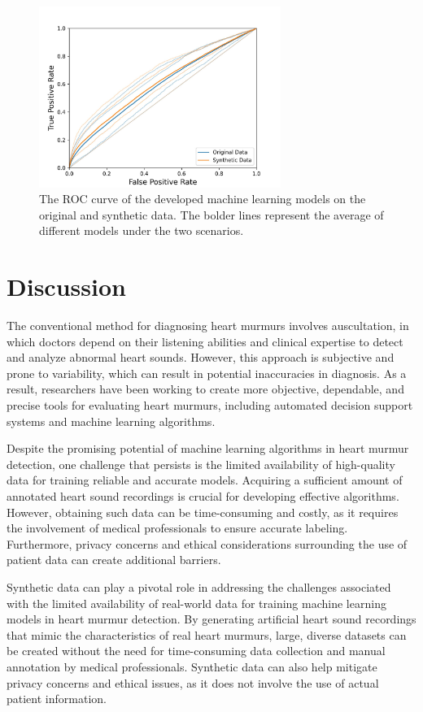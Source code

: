 \documentclass{article}
\begin{document}
\begin{figure}
\centering
    \includegraphics[width=0.7\textwidth]{Documents/ROC.jpg}
    \caption{The ROC curve of the developed machine learning models on the original and synthetic data. The bolder lines represent the average of different models under the two scenarios.}
    \label{fig:ROC}

\end{figure}

\section{Discussion}
The conventional method for diagnosing heart murmurs involves auscultation, in which doctors depend on their listening abilities and clinical expertise to detect and analyze abnormal heart sounds. However, this approach is subjective and prone to variability, which can result in potential inaccuracies in diagnosis. As a result, researchers have been working to create more objective, dependable, and precise tools for evaluating heart murmurs, including automated decision support systems and machine learning algorithms.

\par Despite the promising potential of machine learning algorithms in heart murmur detection, one challenge that persists is the limited availability of high-quality data for training reliable and accurate models. Acquiring a sufficient amount of annotated heart sound recordings is crucial for developing effective algorithms. However, obtaining such data can be time-consuming and costly, as it requires the involvement of medical professionals to ensure accurate labeling. Furthermore, privacy concerns and ethical considerations surrounding the use of patient data can create additional barriers. 

\par Synthetic data can play a pivotal role in addressing the challenges associated with the limited availability of real-world data for training machine learning models in heart murmur detection. By generating artificial heart sound recordings that mimic the characteristics of real heart murmurs, large, diverse datasets can be created without the need for time-consuming data collection and manual annotation by medical professionals. Synthetic data can also help mitigate privacy concerns and ethical issues, as it does not involve the use of actual patient information.
\end{document}
